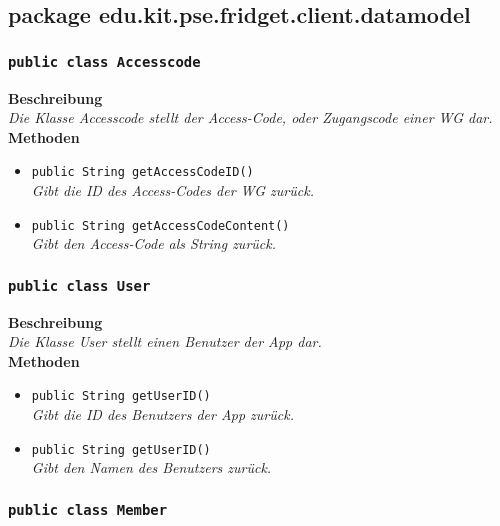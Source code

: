 \subsection{package edu.kit.pse.fridget.client.datamodel}
\subsubsection{\texttt{public class Accesscode}}

	\textbf{Beschreibung} \\
	\textit{Die Klasse Accesscode stellt der Access-Code, oder Zugangscode einer WG dar.} \\

	\textbf{Methoden}
	\begin{itemize}
		\item{\texttt{public String getAccessCodeID()}}\\
		\textit{Gibt die ID des Access-Codes der WG zurück.}\\
		\item{\texttt{public String getAccessCodeContent()}}\\
		\textit{Gibt den Access-Code als String zurück.}\\
	\end{itemize}

	

\subsubsection{\texttt{public class User}}

	\textbf{Beschreibung} \\
	\textit{Die Klasse User stellt einen Benutzer der App dar.}\\

	\textbf{Methoden}
	\begin{itemize}
	\item{\texttt{public String getUserID()}}\\
	\textit{Gibt die ID des Benutzers der App zurück.}\\
	\item{\texttt{public String getUserID()}}\\
	\textit{Gibt den Namen des Benutzers zurück.}\\
	\end{itemize}

	

\subsubsection{\texttt{public class Member}}

